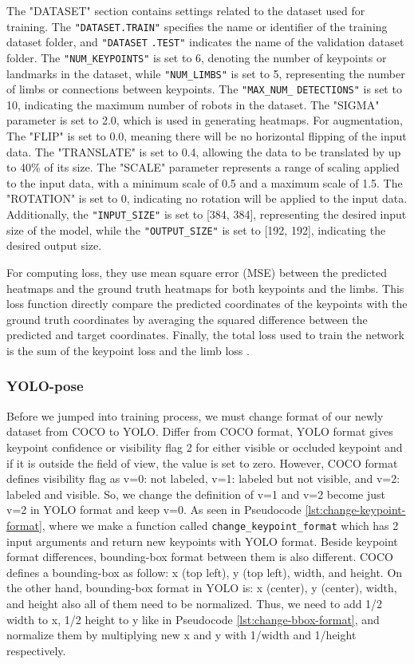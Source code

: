 The "DATASET" section contains settings related to the dataset used for training.
The \verb|"DATASET.TRAIN"| specifies the name or identifier of the training dataset folder, and \verb|"DATASET| \verb|.TEST"| indicates the name of the validation dataset folder. The \verb|"NUM_KEYPOINTS"| is set to 6, denoting the number of keypoints or landmarks in the dataset, while \verb|"NUM_LIMBS"| is set to 5, representing the number of limbs or connections between keypoints.
The \verb|"MAX_NUM_| \verb|DETECTIONS"| is set to 10, indicating the maximum number of robots in the dataset. The "SIGMA" parameter is set to 2.0, which is used in generating heatmaps. For augmentation, The "FLIP" is set to 0.0, meaning there will be no horizontal flipping of the input data. The "TRANSLATE" is set to 0.4, allowing the data to be translated by up to 40\% of its size.
The "SCALE" parameter represents a range of scaling applied to the input data, with a minimum scale of 0.5 and a maximum scale of 1.5. The "ROTATION" is set to 0, indicating no rotation will be applied to the input data. Additionally, the \verb|"INPUT_SIZE"| is set to [384, 384], representing the desired input size of the model, while the \verb|"OUTPUT_SIZE"| is set to [192, 192], indicating the desired output size.

For computing loss, they use mean square error (MSE) between the predicted heatmaps and the ground truth heatmaps for both keypoints and the limbs.
This loss function directly compare the predicted coordinates of the keypoints with the ground truth coordinates by averaging the squared difference between the predicted and target coordinates.
Finally, the total loss used to train the network is the sum of the keypoint loss and the limb loss \parencite{amini2021}.

\subsubsection{YOLO-pose}
\label{subsubsec:training-yolo-pose}

Before we jumped into training process, we must change format of our newly dataset from COCO to YOLO. Differ from COCO format, YOLO format gives keypoint confidence or visibility flag 2 for either visible or occluded keypoint
and if it is outside the field of view, the value is set to zero. However, COCO format defines visibility flag as v=0: not labeled, v=1: labeled but not visible, and v=2: labeled and visible. So, we change the definition of
v=1 and v=2 become just v=2 in YOLO format and keep v=0. As seen in Pseudocode \ref{lst:change-keypoint-format}, where we make a function called \verb|change_keypoint_format| which has 2 input arguments and return new keypoints with YOLO format. 
Beside keypoint format differences, bounding-box format between them is also different. COCO defines a bounding-box as follow: x (top left), y (top left), width, and height. On the other hand,
bounding-box format in YOLO is: x (center), y (center), width, and height also all of them need to be normalized. Thus, we need to add 1/2 width to x, 1/2 height to y like in Pseudocode \ref{lst:change-bbox-format}, and normalize them by multiplying new x and y with 1/width and 1/height respectively. 

